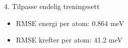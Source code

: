 \documentclass{beamer}
\begin{document}

\begin{frame}
 
\begin{block}{4. Tilpasse endelig treningssett}
 \begin{itemize} 
  \item RMSE energi per atom: 0.864 meV
  \item RMSE krefter per atom: 41.2 meV
 \end{itemize}
\end{block}

\end{frame}
\end{document}
